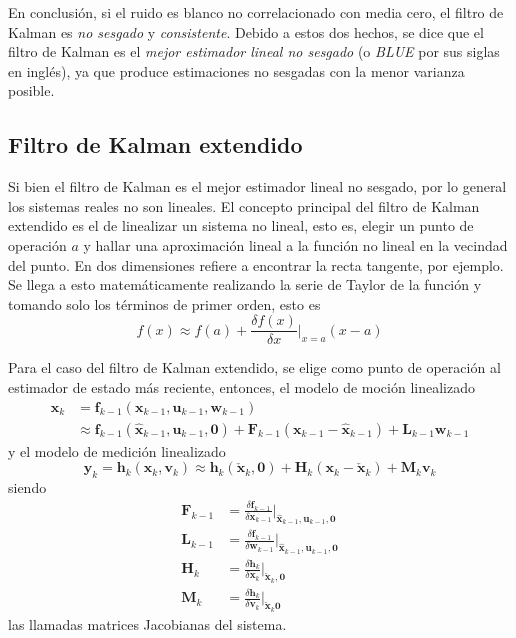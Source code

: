 En conclusión, si el ruido es blanco no correlacionado con media cero, el filtro de Kalman es \textit{no sesgado} y \textit{consistente}. Debido a estos dos hechos, se dice que el filtro de Kalman es el \textit{mejor estimador lineal no sesgado} (o \textit{BLUE} por sus siglas en inglés), ya que produce estimaciones no sesgadas con la menor varianza posible.

\subsection{Filtro de Kalman extendido}
Si bien el filtro de Kalman es el mejor estimador lineal no sesgado, por lo general los sistemas reales no son lineales. El concepto principal del filtro de Kalman extendido es el de linealizar un sistema no lineal, esto es, elegir un punto de operación $a$ y hallar una aproximación lineal a la función no lineal en la vecindad del punto. En dos dimensiones refiere a encontrar la recta tangente, por ejemplo. Se llega a esto matemáticamente realizando la serie de Taylor de la función y tomando solo los términos de primer orden, esto es
\begin{equation}
    f(x)\approx f(a) + \frac{\delta f(x)}{\delta x}\bigg\rvert_{x=a}(x-a)
\end{equation}

Para el caso del filtro de Kalman extendido, se elige como punto de operación al estimador de estado más reciente, entonces, el modelo de moción linealizado
\begin{equation}
    \begin{aligned}
        \bm{x}_k &= \bm{f}_{k-1}(\bm{x}_{k-1},\bm{u}_{k-1},\bm{w}_{k-1})\\
        &\approx \bm{f}_{k-1}(\hat{\bm{x}}_{k-1},\bm{u}_{k-1},\bm{0}) + \bm{F}_{k-1}\left(\bm{x}_{k-1} - \hat{\bm{x}}_{k-1}\right) + \bm{L}_{k-1}\bm{w}_{k-1}
    \end{aligned}
    \label{eq:linearizedmotionmodel}
\end{equation}
y el modelo de medición linealizado
\begin{equation}
    \bm{y}_k = \bm{h}_k(\bm{x}_k,\bm{v}_k)\approx \bm{h}_k(\check{\bm{x}}_k,\bm{0}) + \bm{H}_k(\bm{x}_k - \check{\bm{x}}_k) + \bm{M}_k \bm{v}_k
    \label{eq:linearizedmeasurementmodel}
\end{equation}
siendo
\begin{align}
    \bm{F}_{k-1} &= \frac{\delta \bm{f}_{k-1}}{\delta \bm{x}_{k-1}}\bigg\rvert_{\hat{\bm{x}}_{k-1},\bm{u}_{k-1},\bm{0}} \\
    \bm{L}_{k-1} &= \frac{\delta \bm{f}_{k-1}}{\delta \bm{w}_{k-1}}\bigg\rvert_{\hat{\bm{x}}_{k-1},\bm{u}_{k-1},\bm{0}} \\
    \bm{H}_k &= \frac{\delta \bm{h}_k}{\delta \bm{x}_k}\bigg\rvert_{\check{\bm{x}}_{k},\bm{0}} \\
    \bm{M}_k &= \frac{\delta \bm{h}_k}{\delta \bm{v}_k}\bigg\rvert_{\check{\bm{x}}_{k}\bm{0}}
\end{align}
las llamadas matrices Jacobianas del sistema.

